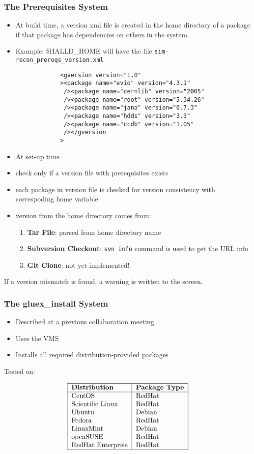 \documentclass{beamer}
\newcommand{\bi}{\begin{itemize}}
\newcommand{\ei}{\end{itemize}}
\newcommand{\I}{\item}
\begin{document}
\begin{frame}[fragile]
  \frametitle{The Prerequisites System}\label{section:prerequisites-system}
\bi
\I At build time, a version xml file is created in the home directory of
a package if that package has dependencies on others in the
system.
\I Example: \$HALLD\_HOME will have the file {\tt sim-recon\_prereqs\_version.xml}
\ei
\begin{verbatim}
                <gversion version="1.0"
                ><package name="evio" version="4.3.1"
                 /><package name="cernlib" version="2005"
                 /><package name="root" version="5.34.26"
                 /><package name="jana" version="0.7.3"
                 /><package name="hdds" version="3.3"
                 /><package name="ccdb" version="1.05"
                 /></gversion
                >
\end{verbatim}
\bi
\I At set-up time
  \I check only if a version file with prerequisites exists
  \I each package in version file is checked for version consistency with correspoding home variable
  \I version from the home directory comes from:
\begin{enumerate}
\item {\bf Tar File}: parsed from home directory name
\item {\bf Subversion Checkout}: {\tt svn info} command is used to get the URL info
\item {\bf Git Clone}: not yet implemented!
\end{enumerate}
\ei
If a version mismatch is found, a warning is written to the screen.

\end{frame}

\begin{frame}
  \frametitle{The gluex\_install System}

\begin{itemize}
\item Described at a previous collaboration meeting
\item Uses the VMS
\item Installs all required distribution-provided packages
\end{itemize}

Tested on:

\begin{table}
$$
\begin{tabular}{|l|l|}
\hline
\bf Distribution & \bf Package Type \\
\hline
CentOS & RedHat \\
Scientific Linux & RedHat \\
Ubuntu & Debian \\
Fedora & RedHat \\
LinuxMint & Debian \\
openSUSE & RedHat \\
RedHat Enterprise & RedHat \\
\hline
\end{tabular}
$$
\end{table}

\end{frame}
\end{document}
